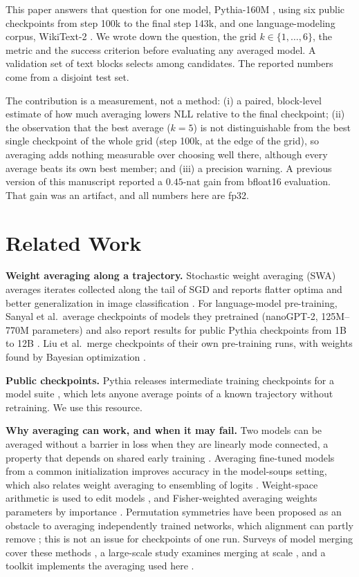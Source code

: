 \documentclass[conference]{IEEEtran}
\begin{document}
This paper answers that question for one model, Pythia-160M \cite{biderman2023pythia}, using six public checkpoints from step 100k to the final step 143k, and one language-modeling corpus, WikiText-2 \cite{merity2016pointer}. We wrote down the question, the grid $k\in\{1,\dots,6\}$, the metric and the success criterion before evaluating any averaged model. A validation set of text blocks selects among candidates. The reported numbers come from a disjoint test set.

The contribution is a measurement, not a method: (i) a paired, block-level estimate of how much averaging lowers NLL relative to the final checkpoint; (ii) the observation that the best average ($k=5$) is not distinguishable from the best single checkpoint of the whole grid (step 100k, at the edge of the grid), so averaging adds nothing measurable over choosing well there, although every average beats its own best member; and (iii) a precision warning. A previous version of this manuscript reported a $0.45$-nat gain from bfloat16 evaluation. That gain was an artifact, and all numbers here are fp32.

\section{Related Work}
\textbf{Weight averaging along a trajectory.} Stochastic weight averaging (SWA) averages iterates collected along the tail of SGD and reports flatter optima and better generalization in image classification \cite{izmailov2018swa}. For language-model pre-training, Sanyal et al.\ average checkpoints of models they pretrained (nanoGPT-2, 125M--770M parameters) and also report results for public Pythia checkpoints from 1B to 12B \cite{sanyal2023lawa}. Liu et al.\ merge checkpoints of their own pre-training runs, with weights found by Bayesian optimization \cite{liu2024ckptmerge}.

\textbf{Public checkpoints.} Pythia releases intermediate training checkpoints for a model suite \cite{biderman2023pythia}, which lets anyone average points of a known trajectory without retraining. We use this resource.

\textbf{Why averaging can work, and when it may fail.} Two models can be averaged without a barrier in loss when they are linearly mode connected, a property that depends on shared early training \cite{frankle2019lmc}. Averaging fine-tuned models from a common initialization improves accuracy in the model-soups setting, which also relates weight averaging to ensembling of logits \cite{wortsman2022soups}. Weight-space arithmetic is used to edit models \cite{ilharco2022taskarith}, and Fisher-weighted averaging weights parameters by importance \cite{matena2021fisher}. Permutation symmetries have been proposed as an obstacle to averaging independently trained networks, which alignment can partly remove \cite{ainsworth2022rebasin}; this is not an issue for checkpoints of one run. Surveys of model merging cover these methods \cite{yang2024mergingsurvey,li2023fusionsurvey}, a large-scale study examines merging at scale \cite{yadav2024scale}, and a toolkit implements the averaging used here \cite{goddard2024mergekit}.
\end{document}
